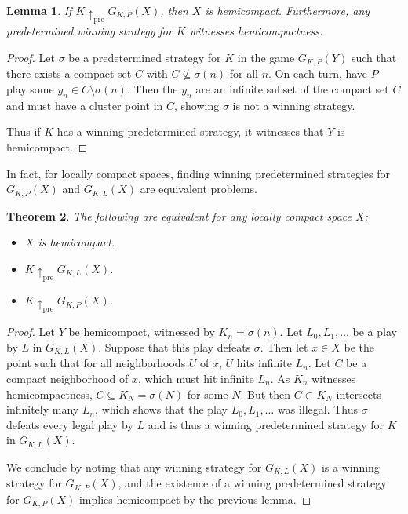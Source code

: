 \documentclass[11pt]{article}
\theoremstyle{plain}
\newtheorem{theorem}{Theorem}
\newtheorem{lemma}[theorem]{Lemma}
\theoremstyle{definition}
\theoremstyle{remark}
\newcommand{\prewin}{\uparrow_{\text{pre}}}
\begin{document}
\begin{lemma}
If $K\prewin G_{K,P}(X)$, then $X$ is hemicompact. Furthermore, any predetermined winning strategy for $K$ witnesses hemicompactness.
\end{lemma}

\begin{proof}
Let $\sigma$ be a predetermined strategy for $K$ in the game $G_{K,P}(Y)$ such that there exists a compact set $C$ with $C \not\subseteq \sigma(n)$ for all $n$. On each turn, have $P$ play some $y_n\in C \setminus \sigma(n)$. Then the $y_n$ are an infinite subset of the compact set $C$ and must have a cluster point in $C$, showing $\sigma$ is not a winning strategy.

Thus if $K$ has a winning predetermined strategy, it witnesses that $Y$ is hemicompact.
\end{proof}

In fact, for locally compact spaces, finding winning predetermined strategies for $G_{K,P}(X)$ and $G_{K,L}(X)$ are equivalent problems.

\begin{theorem}
The following are equivalent for any locally compact space $X$:
  \begin{itemize}
  \item $X$ is hemicompact.
  \item $K \prewin G_{K,L}(X)$.
  \item $K \prewin G_{K,P}(X)$.
  \end{itemize}
\end{theorem}

\begin{proof}
Let $Y$ be hemicompact, witnessed by $K_n=\sigma(n)$. Let $L_0,L_1,\dots$ be a play by $L$ in $G_{K,L}(X)$. Suppose that this play defeats $\sigma$. Then let $x\in X$ be the point such that for all neighborhoods $U$ of $x$, $U$ hits infinite $L_n$. Let $C$ be a compact neighborhood of $x$, which must hit infinite $L_n$. As $K_n$ witnesses hemicompactness, $C \subseteq K_N = \sigma(N)$ for some $N$. But then $C\subset K_N$ intersects infinitely many $L_n$, which shows that the play $L_0,L_1,\dots$ was illegal. Thus $\sigma$ defeats every legal play by $L$ and is thus a winning predetermined strategy for $K$ in $G_{K,L}(X)$.

We conclude by noting that any winning strategy for $G_{K,L}(X)$ is a winning strategy for $G_{K,P}(X)$, and the existence of a winning predetermined strategy for $G_{K,P}(X)$ implies hemicompact by the previous lemma.
\end{proof}
\end{document}
